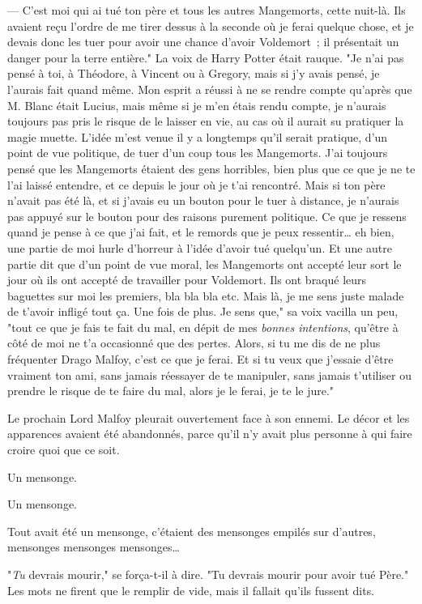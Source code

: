 --- C'est moi qui ai tué ton père et tous les autres Mangemorts, cette nuit-là. Ils avaient reçu l'ordre de me tirer dessus à la seconde où je ferai quelque chose, et je devais donc les tuer pour avoir une chance d'avoir Voldemort~; il présentait un danger pour la terre entière." La voix de Harry Potter était rauque. "Je n'ai pas pensé à toi, à Théodore, à Vincent ou à Gregory, mais si j'y avais pensé, je l'aurais fait quand même. Mon esprit a réussi à ne se rendre compte qu'après que M. Blanc était Lucius, mais même si je m'en étais rendu compte, je n'aurais toujours pas pris le risque de le laisser en vie, au cas où il aurait su pratiquer la magie muette. L'idée m'est venue il y a longtemps qu'il serait pratique, d'un point de vue politique, de tuer d'un coup tous les Mangemorts. J'ai toujours pensé que les Mangemorts étaient des gens horribles, bien plus que ce que je ne te l'ai laissé entendre, et ce depuis le jour où je t'ai rencontré. Mais si ton père n'avait pas été là, et si j'avais eu un bouton pour le tuer à distance, je n'aurais pas appuyé sur le bouton pour des raisons purement politique. Ce que je ressens quand je pense à ce que j'ai fait, et le remords que je peux ressentir… eh bien, une partie de moi hurle d'horreur à l'idée d'avoir tué quelqu'un. Et une autre partie dit que d'un point de vue moral, les Mangemorts ont accepté leur sort le jour où ils ont accepté de travailler pour Voldemort. Ils ont braqué leurs baguettes sur moi les premiers, bla bla bla etc. Mais là, je me sens juste malade de t'avoir infligé tout ça. Une fois de plus. Je sens que," sa voix vacilla un peu, "tout ce que je fais te fait du mal, en dépit de mes \emph{bonnes intentions}, qu'être à côté de moi ne t'a occasionné que des pertes. Alors, si tu me dis de ne plus fréquenter Drago Malfoy, c'est ce que je ferai. Et si tu veux que j'essaie d'être vraiment ton ami, sans jamais réessayer de te manipuler, sans jamais t'utiliser ou prendre le risque de te faire du mal, alors je le ferai, je te le jure."

Le prochain Lord Malfoy pleurait ouvertement face à son ennemi. Le décor et les apparences avaient été abandonnés, parce qu'il n'y avait plus personne à qui faire croire quoi que ce soit.

Un mensonge.

Un mensonge.

Tout avait été un mensonge, c'étaient des mensonges empilés sur d'autres, mensonges mensonges mensonges…

"\emph{Tu} devrais mourir," se força-t-il à dire. "Tu devrais mourir pour avoir tué Père." Les mots ne firent que le remplir de vide, mais il fallait qu'ils fussent dits.

